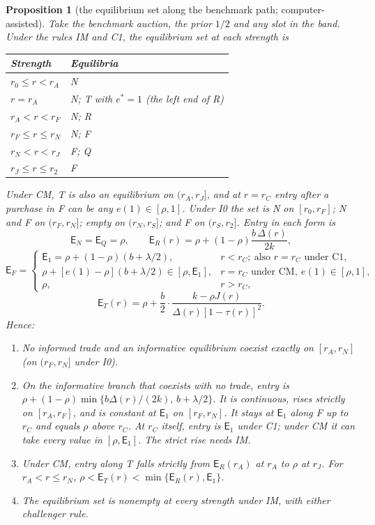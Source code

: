 \documentclass[11pt]{article}
\newtheorem{proposition}{Proposition}
\theoremstyle{definition}
\newcommand{\Ent}{\mathsf E}
\begin{document}
\setcounter{proposition}{2}
\begin{proposition}[the equilibrium set along the benchmark path; computer-assisted]\label{prop:3}
Take the benchmark auction, the prior $1/2$ and any slot in the band. Under the rules IM and C1, the equilibrium
set at each strength is
\begin{center}
\begin{tabular}{@{}ll@{}}
\toprule
Strength & Equilibria\\
\midrule
$r_0\le r<r_A$ & N\\
$r=r_A$ & N; T with $e^*=1$ (the left end of R)\\
$r_A<r<r_F$ & N; R\\
$r_F\le r\le r_N$ & N; F\\
$r_N<r<r_J$ & F; Q\\
$r_J\le r\le r_2$ & F\\
\bottomrule
\end{tabular}
\end{center}
Under CM, T is also an equilibrium on $(r_A,r_J]$, and at $r=r_C$ entry after a purchase in F can be any
$e(1)\in[\rho,1]$. Under I0 the set is N on $[r_0,r_F]$; N and F on $(r_F,r_N]$; empty on $(r_N,r_S]$; and F on
$(r_S,r_2]$. Entry in each form is
\[
\Ent_N=\Ent_Q=\rho,\qquad \Ent_R(r)=\rho+(1-\rho)\frac{b\,\Delta(r)}{2k},
\]
\[
\Ent_F=\begin{cases}\Ent_1=\rho+(1-\rho)(b+\lambda/2), & r<r_C;\ \text{also } r=r_C \text{ under C1},\\
\rho+[e(1)-\rho](b+\lambda/2)\in[\rho,\Ent_1], & r=r_C \text{ under CM},\ e(1)\in[\rho,1],\\
\rho, & r>r_C,\end{cases}
\]
\[
\Ent_T(r)=\rho+\frac b2\cdot\frac{k-\rho J(r)}{\Delta(r)[1-\tau(r)]^2}.
\]
Hence:
\begin{enumerate}[label=(\alph*)]
\item No informed trade and an informative equilibrium coexist exactly on $[r_A,r_N]$ (on $(r_F,r_N]$ under I0).
\item On the informative branch that coexists with no trade, entry is $\rho+(1-\rho)\min\{b\Delta(r)/(2k),\,b+\lambda/2\}$.
  It is continuous, rises strictly on $[r_A,r_F]$, and is constant at $\Ent_1$ on $[r_F,r_N]$. It stays at
  $\Ent_1$ along F up to $r_C$ and equals $\rho$ above $r_C$. At $r_C$ itself, entry is $\Ent_1$ under C1; under CM
  it can take every value in $[\rho,\Ent_1]$. The strict rise needs IM.
\item Under CM, entry along T falls strictly from $\Ent_R(r_A)$ at $r_A$ to $\rho$ at $r_J$. For
  $r_A<r\le r_N$, $\rho<\Ent_T(r)<\min\{\Ent_R(r),\Ent_1\}$.
\item The equilibrium set is nonempty at every strength under IM, with either challenger rule.
\end{enumerate}
\end{proposition}
\end{document}
